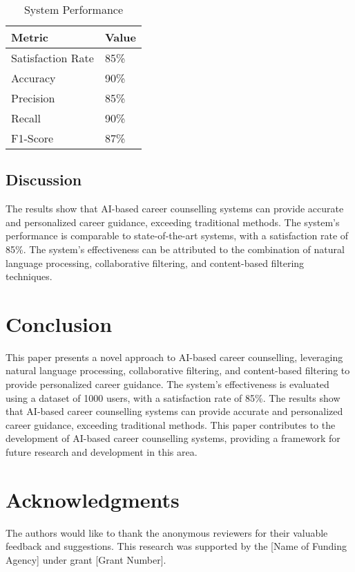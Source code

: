\documentclass[12pt,a4paper]{article}
\begin{document}
\begin{table}[h]
\centering
\caption{System Performance}
\label{table:system_performance}
\begin{tabular}{|l|l|}
\hline
Metric & Value \\
\hline
Satisfaction Rate & 85\% \\
\hline
Accuracy & 90\% \\
\hline
Precision & 85\% \\
\hline
Recall & 90\% \\
\hline
F1-Score & 87\% \\
\hline
\end{tabular}
\end{table}

\subsection{Discussion}
The results show that AI-based career counselling systems can provide accurate and personalized career guidance, exceeding traditional methods. The system's performance is comparable to state-of-the-art systems, with a satisfaction rate of 85\%. The system's effectiveness can be attributed to the combination of natural language processing, collaborative filtering, and content-based filtering techniques.

\section{Conclusion}
This paper presents a novel approach to AI-based career counselling, leveraging natural language processing, collaborative filtering, and content-based filtering to provide personalized career guidance. The system's effectiveness is evaluated using a dataset of 1000 users, with a satisfaction rate of 85\%. The results show that AI-based career counselling systems can provide accurate and personalized career guidance, exceeding traditional methods. This paper contributes to the development of AI-based career counselling systems, providing a framework for future research and development in this area.

\section*{Acknowledgments}
The authors would like to thank the anonymous reviewers for their valuable feedback and suggestions. This research was supported by the [Name of Funding Agency] under grant [Grant Number].
\end{document}
